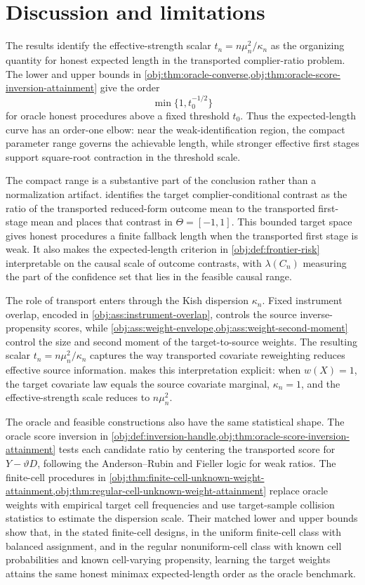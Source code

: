 \section{Discussion and limitations}

The results identify the effective-strength scalar \(t_n=n\mu_n^2/\kappa_n\) as the organizing quantity for honest expected length in the transported complier-ratio problem. The lower and upper bounds in \cref{obj:thm:oracle-converse,obj:thm:oracle-score-inversion-attainment} give the order
\[
\min\{1,t_0^{-1/2}\}
\]
for oracle honest procedures above a fixed threshold \(t_0\). Thus the expected-length curve has an order-one elbow: near the weak-identification region, the compact parameter range governs the achievable length, while stronger effective first stages support square-root contraction in the threshold scale.

The compact range is a substantive part of the conclusion rather than a normalization artifact.  identifies the target complier-conditional contrast as the ratio of the transported reduced-form outcome mean to the transported first-stage mean and places that contrast in \(\Theta=[-1,1]\). This bounded target space gives honest procedures a finite fallback length when the transported first stage is weak. It also makes the expected-length criterion in \cref{obj:def:frontier-risk} interpretable on the causal scale of outcome contrasts, with \(\lambda(C_n)\) measuring the part of the confidence set that lies in the feasible causal range.

The role of transport enters through the Kish dispersion \(\kappa_n\). Fixed instrument overlap, encoded in \cref{obj:ass:instrument-overlap}, controls the source inverse-propensity scores, while \cref{obj:ass:weight-envelope,obj:ass:weight-second-moment} control the size and second moment of the target-to-source weights. The resulting scalar \(t_n=n\mu_n^2/\kappa_n\) captures the way transported covariate reweighting reduces effective source information.  makes this interpretation explicit: when \(w(X)=1\), the target covariate law equals the source covariate marginal, \(\kappa_n=1\), and the effective-strength scale reduces to \(n\mu_n^2\).

The oracle and feasible constructions also have the same statistical shape. The oracle score inversion in \cref{obj:def:inversion-handle,obj:thm:oracle-score-inversion-attainment} tests each candidate ratio by centering the transported score for \(Y-\vartheta D\), following the Anderson--Rubin and Fieller logic for weak ratios. The finite-cell procedures in \cref{obj:thm:finite-cell-unknown-weight-attainment,obj:thm:regular-cell-unknown-weight-attainment} replace oracle weights with empirical target cell frequencies and use target-sample collision statistics to estimate the dispersion scale. Their matched lower and upper bounds show that, in the stated finite-cell designs, in the uniform finite-cell class with balanced assignment, and in the regular nonuniform-cell class with known cell probabilities and known cell-varying propensity, learning the target weights attains the same honest minimax expected-length order as the oracle benchmark.

